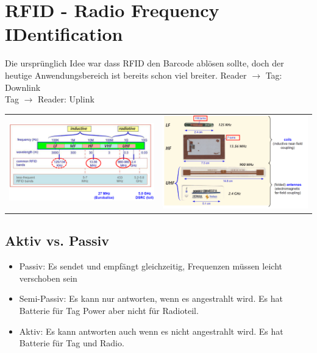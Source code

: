 
\section{RFID - Radio Frequency IDentification}
Die ursprünglich Idee war dass RFID den Barcode ablösen sollte, doch der heutige Anwendungsbereich ist bereits schon viel breiter.
Reader $\rightarrow$ Tag: Downlink \\
Tag $\rightarrow$ Reader: Uplink

\begin{tabular}[h]{c c}

\parbox{9cm}{
    \includegraphics[width=9cm]{./bilder/RFIDFrequenzen.png} } 
&

\parbox{9cm}{
    \includegraphics[width=9cm]{./bilder/RFIDTags.png} } \\
\end{tabular}
\subsection{Aktiv vs. Passiv}
	\begin{itemize}
		\item Passiv: Es sendet und empfängt gleichzeitig, Frequenzen müssen leicht verschoben sein
		\item Semi-Passiv: Es kann nur antworten, wenn es angestrahlt wird. Es hat Batterie für Tag Power aber nicht für Radioteil. 
		\item Aktiv: Es kann antworten auch wenn es nicht angestrahlt wird. Es hat Batterie für Tag und Radio. 
	\end{itemize}
